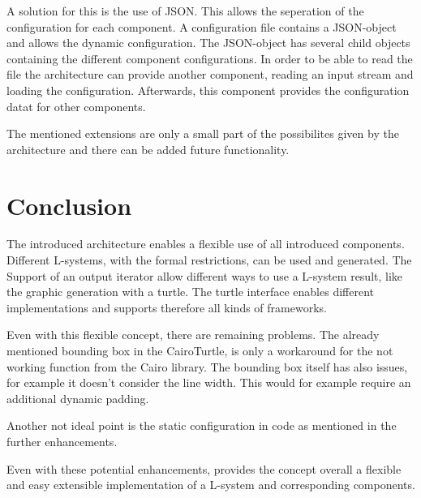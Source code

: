 \documentclass[english]{cpp-hmwk}
\begin{document}
A solution for this is the use of JSON. This allows the seperation of the configuration for each component. A configuration file contains a JSON-object and allows the dynamic configuration. The JSON-object has several child objects containing the different component configurations. In order to be able to read the file the architecture can provide another component, reading an input stream and loading the configuration. Afterwards, this component provides the configuration datat for other components.

\noindent The mentioned extensions are only a small part of the possibilites given by the architecture and there can be added future functionality.

\section{Conclusion}
The introduced architecture enables a flexible use of all introduced components. Different L-systems, with the formal restrictions, can be used and generated. The Support of an output iterator allow different ways to use a L-system result, like the graphic generation with a turtle. The turtle interface enables different implementations and supports therefore all kinds of frameworks. 

\noindent Even with this flexible concept, there are remaining problems. The already mentioned bounding box in the CairoTurtle, is only a workaround for the not working function from the Cairo library. The bounding box itself has also issues, for example it doesn't consider the line width. This would for example require an additional dynamic padding.

Another not ideal point is the static configuration in code as mentioned in the further enhancements. 

\noindent Even with these potential enhancements, provides the concept overall a flexible and easy extensible implementation of a L-system and corresponding components.

\printbibliography
\end{document}
